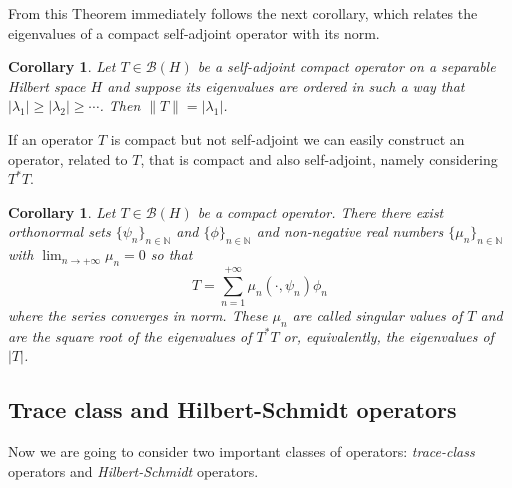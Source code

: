 \documentclass[corpo=11pt, stile=classica, tipotesi=custom,
greek, evenboxes, english]{toptesi}
\numberwithin{equation}{chapter}
\newtheorem{cor}[teo]{Corollary}
\theoremstyle{remark}
\newcommand{\N}{\mathbb{N}} %
\newcommand{\B}{\mathscr{B}} %
\begin{document}
From this Theorem immediately follows the next corollary, which relates the eigenvalues of a compact self-adjoint operator with its norm.
\begin{cor}\label{norm is greatest eigenvalue}
	Let $T \in \B(H)$ be a self-adjoint compact operator on a separable Hilbert space $H$ and suppose its eigenvalues are ordered in such a way that $|\lambda_1| \geq |\lambda_2| \geq \cdots$. Then $\|T\| = |\lambda_1|$.
\end{cor}

If an operator $T$ is compact but not self-adjoint we can easily construct an operator, related to $T$, that is compact and also self-adjoint, namely considering $T^*T$.
\begin{cor}\label{canonical form for compact operators corollary}
	Let $T \in \B(H)$ be a compact operator. There there exist orthonormal sets $\{\psi_n\}_{n \in \N}$ and $\{\phi\}_{n \in \N}$ and non-negative real numbers $\{\mu_n\}_{n \in \N}$ with $\lim_{n \rightarrow +\infty} \mu_n = 0$ so that
	\begin{equation}\label{canonical form for compact operators formula}
		T = \sum_{n=1}^{+\infty} \mu_n (\cdot , \psi_n)\phi_n
	\end{equation}
	where the series converges in norm. These $\mu_n$ are called \emph{singular values} of $T$ and are the square root of the eigenvalues of $T^*T$ or, equivalently, the eigenvalues of $|T|$.
\end{cor}

\subsection{Trace class and Hilbert-Schmidt operators}
Now we are going to consider two important classes of operators: \emph{trace-class} operators and \emph{Hilbert-Schmidt} operators.
\end{document}
